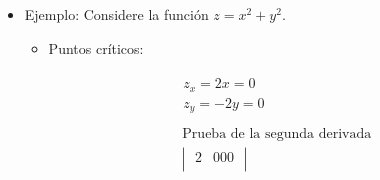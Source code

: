 \begin{itemize}
    \item Ejemplo: Considere la función $z=x^2+y^2$.
        \begin{itemize}
            \item Puntos críticos:
                \begin{center}
                   \begin{align*}
                       \begin{matrix}
                            z_x=2x=0 \\ 
                            z_y = -2y = 0 \\  
                       \end{matrix} 
                       \\ 
                       \text{ Prueba de la segunda derivada } \\ 
                       \begin{vmatrix}
                           2 & 000 \\ 
                       \end{vmatrix} \\ 
                   \end{align*}
                \end{center}
        \end{itemize}
\end{itemize}

